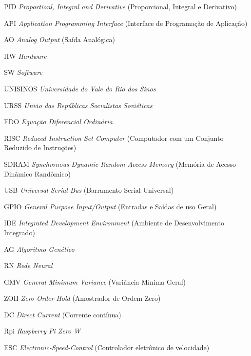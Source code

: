 \listoffigures*
\cleardoublepage
\listoftables*
\cleardoublepage
\begin{siglas}
\item[PID] \textit{Proportionl, Integral and Derivative} (Proporcional, Integral e Derivativo)
\item[API] \textit{Application Programming Interface} (Interface de Programação de Aplicação)
\item[AO] \textit{Analog Output} (Saída Analógica)
\item[HW]  \textit{Hardware}
\item[SW]  \textit{Software}
\item[UNISINOS]  \textit{Universidade do Vale do Rio dos Sinos}
\item[URSS]  \textit{União das Repúblicas Socialistas Soviéticas}
\item[EDO]  \textit{Equação Diferencial Ordinária}
\item[RISC]  \textit{Reduced Instruction Set Computer} (Computador com um Conjunto Reduzido de Instruções)
\item[SDRAM]  \textit{Synchronous Dynamic Random-Access Memory} (Memória de Acesso Dinâmico Randômico)
\item[USB]   \textit{Universal Serial Bus}  (Barramento Serial Universal)
\item[GPIO]  \textit{General Purpose Input/Output} (Entradas e Saídas de uso Geral)
\item[IDE]  \textit{Integrated Development Environment} (Ambiente de Desenvolvimento Integrado)
\item[AG]  \textit{Algoritmo Genético}
\item[RN]  \textit{Rede Neural}
\item[GMV]  \textit{General Minimum Variance} (Variância Mínima Geral)
\item[ZOH]  \textit{Zero-Order-Hold} (Amostrador de Ordem Zero)
\item[DC]  \textit{Direct Current} (Corrente contínua)
\item[Rpi]  \textit{Raspberry Pi Zero W}
\item[ESC]  \textit{Electronic-Speed-Control} (Controlador eletrônico de velocidade)
\end{siglas}
